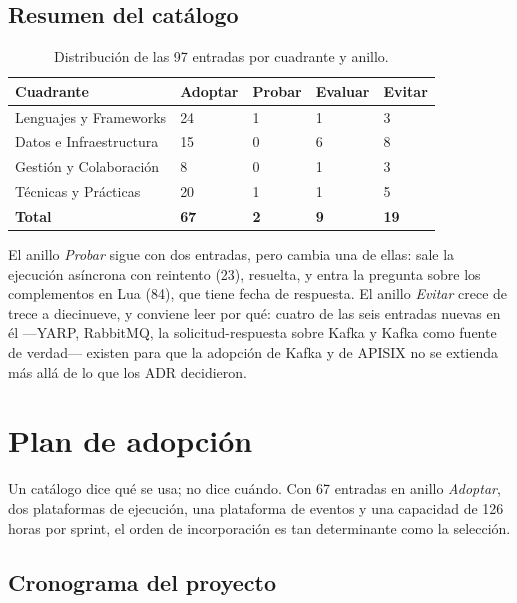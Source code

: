 \documentclass[11pt,a4paper]{article}
\begin{document}
\subsection{Resumen del catálogo}

\begin{longtable}{L{5.6cm} C{2.0cm} C{2.0cm} C{2.0cm} C{2.0cm}}
\caption{Distribución de las 97 entradas por cuadrante y anillo.}\label{tab:distribucion}\\
\toprule
\textbf{Cuadrante} & \textbf{Adoptar} & \textbf{Probar} & \textbf{Evaluar} & \textbf{Evitar} \\
\midrule
\endhead
\bottomrule
\endlastfoot
Lenguajes y Frameworks & 24 & 1 & 1 & 3 \\
Datos e Infraestructura & 15 & 0 & 6 & 8 \\
Gestión y Colaboración & 8 & 0 & 1 & 3 \\
Técnicas y Prácticas & 20 & 1 & 1 & 5 \\
\midrule
\textbf{Total} & \textbf{67} & \textbf{2} & \textbf{9} & \textbf{19} \\
\end{longtable}

\vspace{0.2cm}
El anillo \emph{Probar} sigue con dos entradas, pero cambia una de ellas: sale la ejecución asíncrona con reintento (23), resuelta, y entra la pregunta sobre los complementos en Lua (84), que tiene fecha de respuesta. El anillo \emph{Evitar} crece de trece a diecinueve, y conviene leer por qué: cuatro de las seis entradas nuevas en él ---YARP, RabbitMQ, la solicitud-respuesta sobre Kafka y Kafka como fuente de verdad--- existen para que la adopción de Kafka y de APISIX no se extienda más allá de lo que los ADR decidieron.

\section{Plan de adopción}
\label{sec:adopcion}

Un catálogo dice qué se usa; no dice cuándo. Con 67 entradas en anillo \emph{Adoptar}, dos plataformas de ejecución, una plataforma de eventos y una capacidad de 126 horas por sprint, el orden de incorporación es tan determinante como la selección.

\subsection{Cronograma del proyecto}
\end{document}
